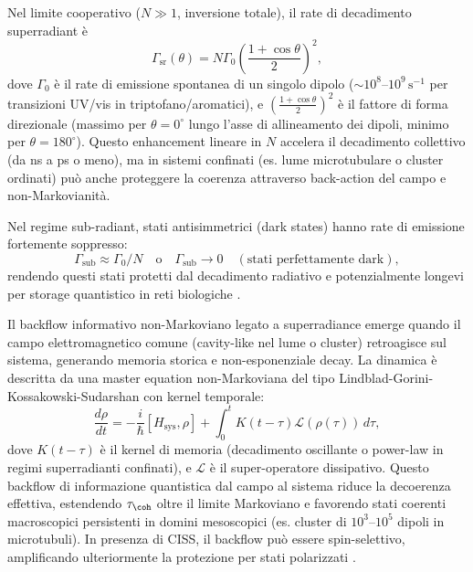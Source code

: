\documentclass[11pt,a4paper]{article}
\let\oldcite\cite
\renewcommand{\cite}{\protect\oldcite}
\theoremstyle{plain}
\theoremstyle{definition}
\begin{document}
Nel limite cooperativo ($N \gg 1$, inversione totale), il rate di decadimento superradiant è
\begin{equation}
\Gamma_{\mathrm{sr}}(\theta) = N \Gamma_0 \left( \frac{1 + \cos\theta}{2} \right)^2,
\label{eq:superradiance_rate_detailed}
\end{equation}
dove $\Gamma_0$ è il rate di emissione spontanea di un singolo dipolo ($\sim 10^8$--$10^9\,\mathrm{s}^{-1}$ per transizioni UV/vis in triptofano/aromatici), e $\left( \frac{1 + \cos\theta}{2} \right)^2$ è il fattore di forma direzionale (massimo per $\theta = 0^\circ$ lungo l'asse di allineamento dei dipoli, minimo per $\theta = 180^\circ$). Questo enhancement lineare in $N$ accelera il decadimento collettivo (da ns a ps o meno), ma in sistemi confinati (es. lume microtubulare o cluster ordinati) può anche proteggere la coerenza attraverso back-action del campo e non-Markovianità.

Nel regime sub-radiant, stati antisimmetrici (dark states) hanno rate di emissione fortemente soppresso:
\begin{equation}
\Gamma_{\mathrm{sub}} \approx \Gamma_0 / N \quad \text{o} \quad \Gamma_{\mathrm{sub}} \to 0 \quad (\text{stati perfettamente dark}),
\label{eq:subradiant_rate}
\end{equation}
rendendo questi stati protetti dal decadimento radiativo e potenzialmente longevi per storage quantistico in reti biologiche \cite{gross1982superradiance, mazets2007subradiance, babcock2024superradiance}.

Il backflow informativo non-Markoviano legato a superradiance emerge quando il campo elettromagnetico comune (cavity-like nel lume o cluster) retroagisce sul sistema, generando memoria storica e non-esponenziale decay. La dinamica è descritta da una master equation non-Markoviana del tipo Lindblad-Gorini-Kossakowski-Sudarshan con kernel temporale:
\begin{equation}
\frac{d\rho}{dt} = -\frac{i}{\hbar} [H_{\mathrm{sys}}, \rho] + \int_0^t K(t - \tau) \mathcal{L}(\rho(\tau)) \, d\tau,
\label{eq:non_markovian_master}
\end{equation}
dove $K(t - \tau)$ è il kernel di memoria (decadimento oscillante o power-law in regimi superradianti confinati), e $\mathcal{L}$ è il super-operatore dissipativo. Questo backflow di informazione quantistica dal campo al sistema riduce la decoerenza effettiva, estendendo $\tau_{\coh}$ oltre il limite Markoviano e favorendo stati coerenti macroscopici persistenti in domini mesoscopici (es. cluster di $10^3$--$10^5$ dipoli in microtubuli). In presenza di CISS, il backflow può essere spin-selettivo, amplificando ulteriormente la protezione per stati polarizzati \cite{mavromatos2025microtubules, nishiyama2025qbd, kurian2025tryptophan, breuer2002theory}.
\end{document}
